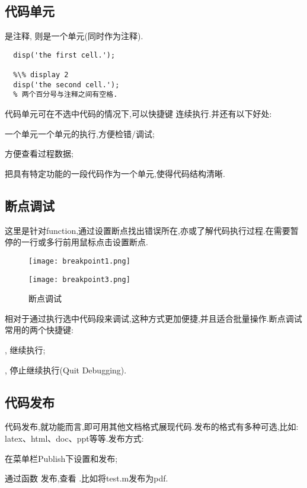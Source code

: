 


\subsection{代码单元}
\mcode{\%} 是注释, \mcode{\%\%} 则是一个单元(同时作为注释). 

\vspace{-0.8cm}
\begin{lstlisting}[caption=代码单元]
  %\% display 1
  disp('the first cell.');

  %\% display 2
  disp('the second cell.');
  % 两个百分号与注释之间有空格.
\end{lstlisting}

代码单元可在不选中代码的情况下,可以快捷键  连续执行.并还有以下好处:
\begindot
  \item 一个单元一个单元的执行,方便检错/调试;
  \item 方便查看过程数据;
  \item 把具有特定功能的一段代码作为一个单元,使得代码结构清晰.
\myenddot



\subsection{断点调试}
这里是针对function,通过设置断点找出错误所在,亦或了解代码执行过程.在需要暂停的一行或多行前用鼠标点击设置断点.

\begin{figure}[htbp]
  \centering
  \texttt{[image: breakpoint1.png]}
\end{figure}

\begin{figure}[htbp]
  \centering
  \texttt{[image: breakpoint3.png]}
  \caption{断点调试}
\end{figure}

相对于通过执行选中代码段来调试,这种方式更加便捷,并且适合批量操作.断点调试常用的两个快捷键:
\begindot
  \item {}, 继续执行;
  \item {}, 停止继续执行(Quit Debugging).
\myenddot



\subsection{代码发布}
 代码发布,就功能而言,即可用其他文档格式展现代码.发布的格式有多种可选,比如: latex、html、doc、ppt等等.发布方式:
 \begindot
  \item 在菜单栏Publish下设置和发布;
  \item 通过函数  发布,查看 .比如将test.m发布为pdf.

